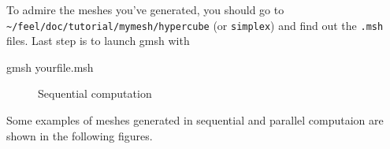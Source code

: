 \newline
To admire the meshes you've generated, you should go to \lstinline!~/feel/doc/tutorial/mymesh/hypercube! (or \lstinline!simplex!) and find out the \verb|.msh| files. Last step is to launch gmsh with
\begin{unixcom}
		gmsh yourfile.msh
\end{unixcom}


\begin{figure}[!h]
  \centering
  \newline
  \centering
  \caption{Sequential computation}
\end{figure}
\label{fig:2}
\newline
Some examples of meshes generated in sequential and parallel computaion are shown in the following figures.

